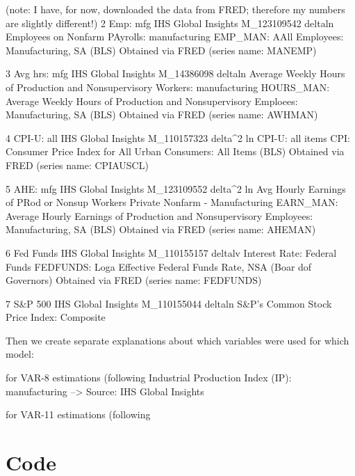 \documentclass[a4paper,12pt,oneside,pointednumbers,bibtotoc,bigheadings,liststotoc]{scrbook}
\begin{document}
(note: I have, for now, downloaded the data from FRED; therefore my numbers are slightly different!)
2	Emp: mfg		IHS Global Insights	M_123109542		deltaln	Employees on Nonfarm PAyrolls: manufacturing
EMP_MAN: AAll Employees: Manufacturing, SA (BLS) Obtained via FRED (series name: MANEMP)

3	Avg hrs: mfg	IHS Global Insights	M_14386098		deltaln	Average Weekly Hours of Production and Nonsupervisory Workers: manufacturing
HOURS_MAN: Average Weekly Hours of Production and Nonsupervisory Emploees: Manufacturing, SA (BLS)
Obtained via FRED (series name: AWHMAN)

4	CPI-U: all		IHS Global Insights	M_110157323		delta^2 ln	CPI-U: all items
CPI: Consumer Price Index for All Urban Consumers: All Items (BLS) Obtained via FRED (series name: CPIAUSCL)

5	AHE: mfg		IHS Global Insights	M_123109552		delta^2 ln	Avg Hourly Earnings of PRod or Nonsup Workers Private Nonfarm - Manufacturing
EARN_MAN: Average Hourly Earnings of Production and Nonsupervisory Employees: Manufacturing, SA (BLS)
Obtained via FRED (series name: AHEMAN)

6	Fed Funds	IHS Global Insights	M_110155157		deltalv	Interest Rate: Federal Funds
FEDFUNDS: Loga Effective Federal Funds Rate, NSA (Boar dof Governors) Obtained via FRED (series name: FEDFUNDS)

7	S\&P 500		IHS Global Insights	M_110155044		deltaln	S\&P's Common Stock Price Index: Composite
												





Then we create separate explanations about which variables were used for which model:

for VAR-8 estimations (following \citet{bloom:09}
Industrial Production Index (IP): manufacturing --> Source: IHS Global Insights

for VAR-11 estimations (following \citet{bloom:09}


\fancyhfoffset[E,O]{0pt}
\section{Code}
\label{sec:rcode}

\end{document}
